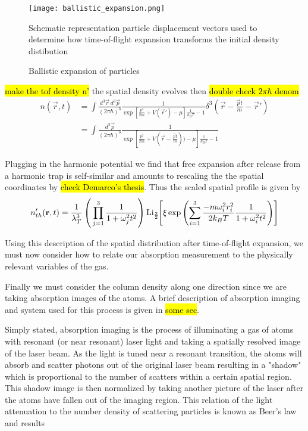 \begin{figure} 
	\centerline{
	\texttt{[image: ballistic\_expansion.png]}}
	\caption{Ballistic expansion of particles}{Schematic representation particle displacement vectors used to determine how time-of-flight expansion transforms the initial density distibution}
\end{figure}

\hl{make the tof density n'}
the spatial density evolves then \hl{double check $2\pi \hbar$ denom}
\begin{equation}
\begin{split}
n(\vec{r},t) &= \int \frac{d^3\vec{r}\,d^3\vec{p}}{(2\pi\hbar)^3}\frac{1}{\exp{\left[\frac{p^2}{2m} + V(\vec{r}') - \mu\right]\frac{1}{k_BT}}-1}\delta^3\left(\vec{r}-\frac{\vec{p}t}{m}-\vec{r}'\right) \\
&= \int \frac{d^3\vec{p}}{(2\pi\hbar)^3}\frac{1}{\exp{\left[\frac{p^2}{2m} + V\left(\vec{r}-\frac{\vec{p}t}{m}\right)) - \mu\right]\frac{1}{k_BT}}-1} 
\end{split}
\end{equation}

Plugging in the harmonic potential we find that free expansion after release from a harmonic trap is self-similar and amounts to rescaling the the spatial coordinates by \hl{check Demarco's thesis}. Thus the scaled spatial profile is given by
\begin{equation}
n_{th}'(\mathbf{r},t) = \frac{1}{\lambda_T^3} 
\left(\, \prod_{j=1}^3 \frac{1}{1+\omega_j^2 t^2} \right) 
\text{Li}_{\scriptscriptstyle\frac{3}{2}\!}\!\left[  \xi \, \text{exp}\left( {\sum_{i=1}^3 \frac{-m\omega_i^2r_i^2}{2k_BT} \frac{1}{1+\omega_i^2t^2}} \right)  \right]
\end{equation}

Using this description of the spatial distribution after time-of-flight expansion, we must now consider how to relate our absorption measurement to the physically relevant variables of the gas.

Finally we must consider the column density along one direction since we are taking absorption images of the atoms. A brief description of absorption imaging and system used for this process is given in \hl{some sec}. 

Simply stated, absorption imaging is the process of illuminating a gas of atoms with resonant (or near resonant) laser light and taking a spatially resolved image of the laser beam. As the light is tuned near a resonant transition, the atoms will absorb and scatter photons out of the original laser beam resulting in a "shadow" which is proportional to the number of scatters within a certain spatial region. This shadow image is then normalized by taking another picture of the laser after the atoms have fallen out of the imaging region. This relation of the light attenuation to the number density of scattering particles is known as Beer's law and results 

